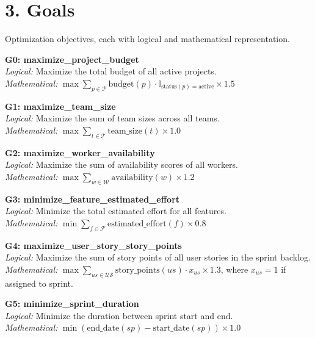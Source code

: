 \documentclass[12pt]{article}
\begin{document}
\section{3. Goals}

Optimization objectives, each with logical and mathematical representation.

\item \textbf{G0: maximize\_project\_budget} \\
    \textit{Logical:} Maximize the total budget of all active projects. \\
    \textit{Mathematical:} $ \max \sum_{p \in \mathcal{P}} \text{budget}(p) \cdot \mathbb{I}_{\text{status}(p) = \text{active}} \times 1.5 $

    \item \textbf{G1: maximize\_team\_size} \\
    \textit{Logical:} Maximize the sum of team sizes across all teams. \\
    \textit{Mathematical:} $ \max \sum_{t \in \mathcal{T}} \text{team\_size}(t) \times 1.0 $

    \item \textbf{G2: maximize\_worker\_availability} \\
    \textit{Logical:} Maximize the sum of availability scores of all workers. \\
    \textit{Mathematical:} $ \max \sum_{w \in \mathcal{W}} \text{availability}(w) \times 1.2 $

    \item \textbf{G3: minimize\_feature\_estimated\_effort} \\
    \textit{Logical:} Minimize the total estimated effort for all features. \\
    \textit{Mathematical:} $ \min \sum_{f \in \mathcal{F}} \text{estimated\_effort}(f) \times 0.8 $

    \item \textbf{G4: maximize\_user\_story\_story\_points} \\
    \textit{Logical:} Maximize the sum of story points of all user stories in the sprint backlog. \\
    \textit{Mathematical:} $ \max \sum_{us \in \mathcal{US}} \text{story\_points}(us) \cdot x_{us} \times 1.3 $, where $ x_{us} = 1 $ if assigned to sprint.

    \item \textbf{G5: minimize\_sprint\_duration} \\
    \textit{Logical:} Minimize the duration between sprint start and end. \\
    \textit{Mathematical:} $ \min (\text{end\_date}(sp) - \text{start\_date}(sp)) \times 1.0 $
\end{document}
